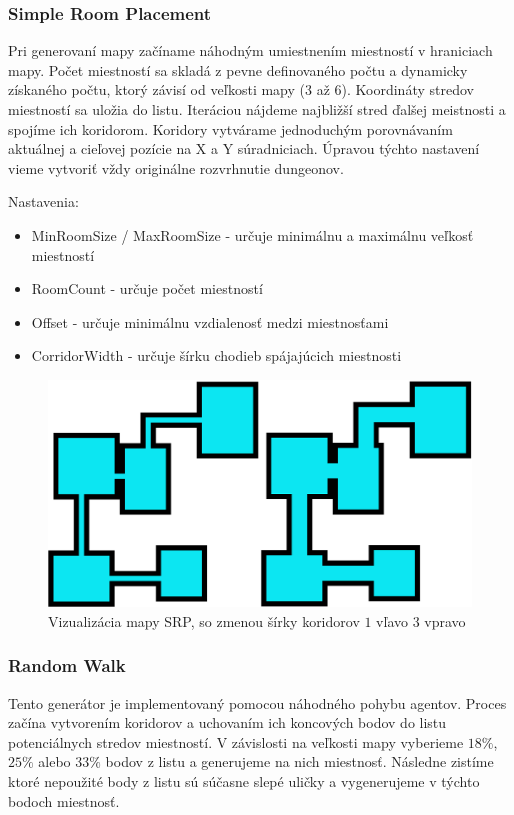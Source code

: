 \subsubsection*{Simple Room Placement}

Pri generovaní mapy začíname náhodným umiestnením miestností v hraniciach mapy. Počet miestností sa skladá z pevne definovaného počtu a dynamicky získaného počtu, ktorý závisí od veľkosti mapy ($3$ až $6$). Koordináty stredov miestností sa uložia do listu. Iteráciou nájdeme najbližší stred ďalšej meistnosti a spojíme ich koridorom. Koridory vytvárame jednoduchým porovnávaním aktuálnej a cieľovej pozície na X a Y súradniciach. Úpravou týchto nastavení vieme vytvoriť vždy originálne rozvrhnutie dungeonov.

\noindent Nastavenia:

\begin{itemize}
    \item MinRoomSize / MaxRoomSize - určuje minimálnu a maximálnu veľkosť miestností
    \item RoomCount - určuje počet miestností
    \item Offset - určuje minimálnu vzdialenosť medzi miestnosťami
    \item CorridorWidth - určuje šírku chodieb spájajúcich miestnosti
\end{itemize}

\begin{figure} [H]
    \centering
    \includegraphics[width=0.47\linewidth]{obrazky-figures/srp.png}
    \caption{Vizualizácia mapy SRP, so zmenou šírky koridorov $1$ vľavo $3$ vpravo}
    \label{fig:srp}
\end{figure}

\subsubsection*{Random Walk}

Tento generátor je implementovaný pomocou náhodného pohybu agentov. Proces začína vytvorením koridorov a uchovaním ich koncových bodov do listu potenciálnych stredov miestností. V závislosti na veľkosti mapy vyberieme $18\%$, $25\%$ alebo $33\%$ bodov z listu a generujeme na nich miestnosť. Následne zistíme ktoré nepoužité body z listu sú súčasne slepé uličky a vygenerujeme v týchto bodoch miestnosť.

